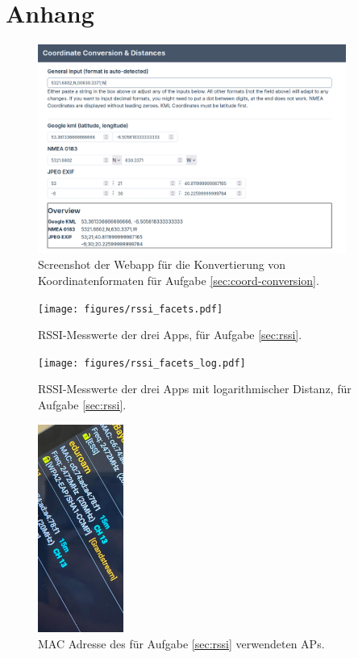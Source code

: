 \section*{Anhang}

\begin{figure}[h]
    \centering
    \includegraphics[width=0.9\textwidth]{figures/koordinaten.png}
    \caption{Screenshot der Webapp für die Konvertierung von Koordinatenformaten für Aufgabe \ref{sec:coord-conversion}.}
    \label{webapp-coordinates}
\end{figure}


\begin{figure}[h]
    \centering
    \texttt{[image: figures/rssi\_facets.pdf]}
    \caption{RSSI-Messwerte der drei Apps, für Aufgabe \ref{sec:rssi}.}
    \label{rssi-facet}
\end{figure}

\begin{figure}[h]
    \centering
    \texttt{[image: figures/rssi\_facets\_log.pdf]}
    \caption{RSSI-Messwerte der drei Apps mit logarithmischer Distanz, für Aufgabe \ref{sec:rssi}.}
    \label{rssi-log}
\end{figure}


\begin{figure}[h]
    \centering
    \includegraphics[width=0.25\textwidth]{figures/rssi-ssid.jpg}
    \caption{MAC Adresse des für Aufgabe \ref{sec:rssi} verwendeten APs.}
    \label{rssi-mac}
\end{figure}

